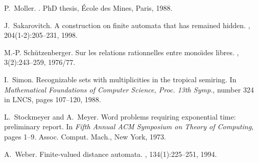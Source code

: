 \documentclass{article}
\newcommand{\1}{\mathbb{1}}
\newcommand{\0}{\mathbb{0}}
\begin{document}
\begin{thebibliography}{1}
P.~Moller.
.
\newblock PhD thesis, \'Ecole des Mines, Paris, 1988.

J.~Sakarovitch.
\newblock A construction on finite automata that has remained hidden.
, 204(1-2):205--231, 1998.

M.-P. Sch{\"u}tzenberger.
\newblock Sur les relations rationnelles entre mono\"{\i}des libres.
, 3(2):243--259, 1976/77.

I.~Simon.
\newblock Recognizable sets with multiplicities in the tropical semiring.
\newblock In {\em Mathematical Foundations of Computer Science, Proc. 13th
  Symp.}, number 324 in LNCS, pages 107--120, 1988.

L.~Stockmeyer and A.~Meyer.
\newblock Word problems requiring exponential time: preliminary report.
\newblock In {\em Fifth Annual ACM Symposium on Theory of Computing}, pages
  1--9. Assoc. Comput. Mach., New York, 1973.

A.~Weber.
\newblock Finite-valued distance automata.
, 134(1):225--251, 1994.

\end{thebibliography}
\end{document}
